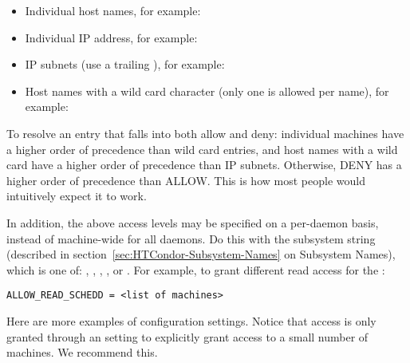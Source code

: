 \begin{itemize}
\item Individual host names, for example: 
\item Individual IP address, for example: 
\item IP subnets (use a trailing \Expr{*}),
 for example: 
\item Host names with a wild card \Expr{*} character
 (only one \Expr{*} is allowed per name),
 for example: 
\end{itemize}

To resolve an entry that falls into both allow and deny:
individual
machines have a higher order of precedence than wild card entries, and
host names with a wild card have a higher order of precedence than IP
subnets.
Otherwise, DENY has a higher order of precedence than ALLOW.
This is how most people would intuitively expect it to work.  

In addition, the above access levels may be specified on a
per-daemon basis, instead of machine-wide for all daemons.
Do this with the subsystem string (described in
section~\ref{sec:HTCondor-Subsystem-Names} on Subsystem Names),
which is one of: , , , ,
or .
For example, to grant different read access for the :
\footnotesize
\begin{verbatim}
ALLOW_READ_SCHEDD = <list of machines>
\end{verbatim}
\normalsize


Here are more examples of configuration settings.
Notice that  access is
only granted through an  setting to explicitly grant access to
a small number of machines.  We recommend this.

